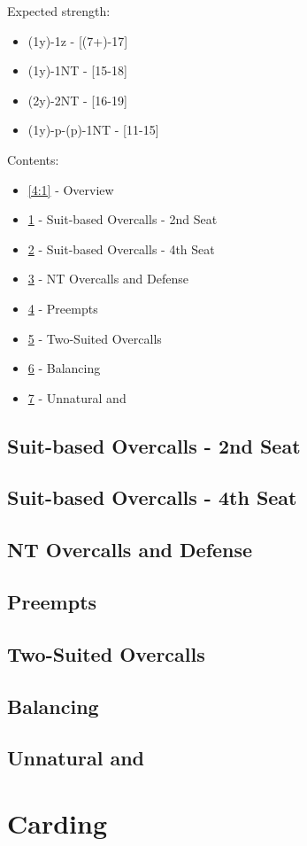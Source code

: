 \documentclass[12pt]{report}
\newcommand{\n}{\\}
\newcommand{\ul}[1]{\begin{itemize}#1\end{itemize}}
\newcommand{\li}{\item[~]}
\newcommand{\bidsection}[2]{\section{\texorpdfstring{#1}{#2}}}
\begin{document}
    Expected strength:
    \begin{itemize} \itemsep0em
        \li (1y)-1z - [(7+)-17]
        \li (1y)-1NT - [15-18]
        \li (2y)-2NT - [16-19]
        \li (1y)-p-(p)-1NT - [11-15] \n
    \end{itemize}

    Contents:
    \ul {
        \li \ref{4:1} - Overview
        \li \ref{4:2} - Suit-based Overcalls - 2nd Seat
        \li \ref{4:3} - Suit-based Overcalls - 4th Seat
        \li \ref{4:4} - NT Overcalls and Defense
        \li \ref{4:5} - Preempts
        \li \ref{4:6} - Two-Suited Overcalls
        \li \ref{4:7} - Balancing
        \li \ref{4:8} - Unnatural \cl1 and \di1
    }

\section{Suit-based Overcalls - 2nd Seat} \label{4:2}
\section{Suit-based Overcalls - 4th Seat} \label{4:3}
\section{NT Overcalls and Defense} \label{4:4}
\section{Preempts} \label{4:5}
\section{Two-Suited Overcalls} \label{4:6}
\section{Balancing} \label{4:7}
\bidsection{Unnatural  and }{Unnatural 1♣ and 1♢} \label{4:8}



\chapter{Carding}
\end{document}
